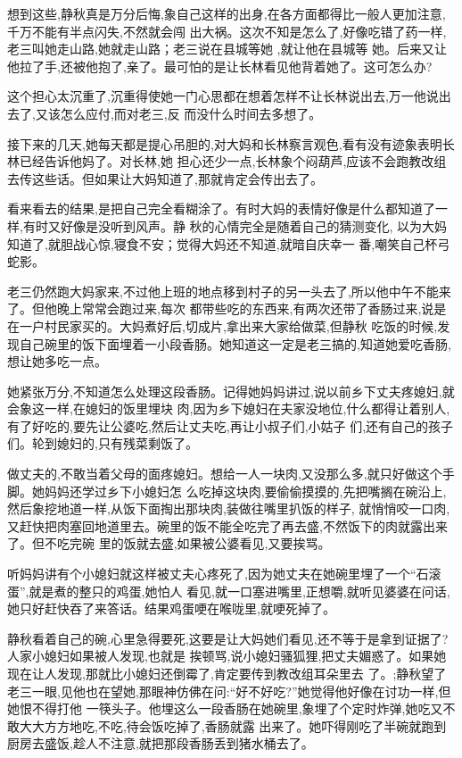 ﻿\documentclass[12pt]{article}
\begin{document}
想到这些,静秋真是万分后悔,象自己这样的出身,在各方面都得比一般人更加注意,千万不能有半点闪失,不然就会闯
出大祸。这次不知是怎么了,好像吃错了药一样,老三叫她走山路,她就走山路；老三说在县城等她 ,就让他在县城等
她。后来又让他拉了手,还被他\myrule 抱了,亲了。最可怕的是让长林看见他背着她了。这可怎么办?

这个担心太沉重了,沉重得使她一门心思都在想着怎样不让长林说出去,万一他说出去了,又该怎么应付,而对老三,反
而没什么时间去多想了。

接下来的几天,她每天都是提心吊胆的,对大妈和长林察言观色,看有没有迹象表明长林已经告诉他妈了。对长林,她
担心还少一点,长林象个闷葫芦,应该不会跑教改组去传这些话。但如果让大妈知道了,那就肯定会传出去了。

看来看去的结果,是把自己完全看糊涂了。有时大妈的表情好像是什么都知道了一样,有时又好像是没听到风声。静
秋的心情完全是随着自己的猜测变化, 以为大妈知道了,就胆战心惊,寝食不安；觉得大妈还不知道,就暗自庆幸一
番,嘲笑自己杯弓蛇影。

老三仍然跑大妈家来,不过他上班的地点移到村子的另一头去了,所以他中午不能来了。但他晚上常常会跑过来,每次
都带些吃的东西来,有两次还带了香肠过来,说是在一户村民家买的。大妈煮好后,切成片,拿出来大家给做菜,但静秋
吃饭的时候,发现自己碗里的饭下面埋着一小段香肠。她知道这一定是老三搞的,知道她爱吃香肠,想让她多吃一点。

她紧张万分,不知道怎么处理这段香肠。记得她妈妈讲过,说以前乡下丈夫疼媳妇,就会象这一样,在媳妇的饭里埋块
肉,因为乡下媳妇在夫家没地位,什么都得让着别人,有了好吃的,要先让公婆吃,然后让丈夫吃,再让小叔子们,小姑子
们,还有自己的孩子们。轮到媳妇的,只有残菜剩饭了。

做丈夫的,不敢当着父母的面疼媳妇。想给一人一块肉,又没那么多,就只好做这个手脚。她妈妈还学过乡下小媳妇怎
么吃掉这块肉,要偷偷摸摸的,先把嘴搁在碗沿上,然后象挖地道一样,从饭下面掏出那块肉,装做往嘴里扒饭的样子,
就悄悄咬一口肉,又赶快把肉塞回地道里去。碗里的饭不能全吃完了再去盛,不然饭下的肉就露出来了。但不吃完碗
里的饭就去盛,如果被公婆看见,又要挨骂。

听妈妈讲有个小媳妇就这样被丈夫心疼死了,因为她丈夫在她碗里埋了一个``石滚蛋'',就是煮的整只的鸡蛋,她怕人
看见,就一口塞进嘴里,正想嚼,就听见婆婆在问话,她只好赶快吞了来答话。结果鸡蛋哽在喉咙里,就哽死掉了。

静秋看着自己的碗,心里急得要死,这要是让大妈她们看见,还不等于是拿到证据了?人家小媳妇如果被人发现,也就是
挨顿骂,说小媳妇骚狐狸,把丈夫媚惑了。如果她现在让人发现,那就比小媳妇还倒霉了,肯定要传到教改组耳朵里去
了。;静秋望了老三一眼,见他也在望她,那眼神仿佛在问:``好不好吃?''她觉得他好像在讨功一样,但她恨不得打他
一筷头子。他埋这么一段香肠在她碗里,象埋了个定时炸弹,她吃又不敢大大方方地吃,不吃,待会饭吃掉了,香肠就露
出来了。她吓得刚吃了半碗就跑到厨房去盛饭,趁人不注意,就把那段香肠丢到猪水桶去了。
\end{document}
